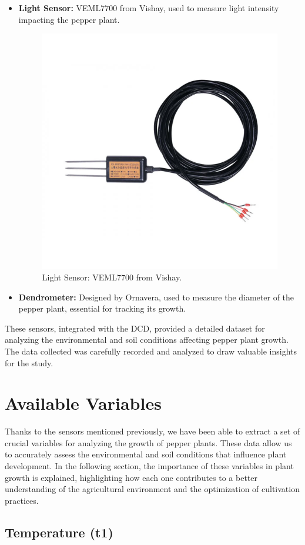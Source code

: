 \begin{itemize}
    \item \textbf{Light Sensor:} VEML7700 from Vishay, used to measure light intensity impacting the pepper plant.
    \begin{figure}[htbp]
        \centering
        \includegraphics[width=6 cm]{4_ChapterMaterials/figuras/MEC10.png}
        \caption{Light Sensor: VEML7700 from Vishay.\cite{ornavera2020dcd}}
        \end{figure}

    \item \textbf{Dendrometer:} Designed by Ornavera, used to measure the diameter of the pepper plant, essential for tracking its growth.
\end{itemize}


These sensors, integrated with the DCD, provided a detailed dataset for analyzing the environmental and soil conditions affecting pepper plant growth. The data collected was carefully recorded and analyzed to draw valuable insights for the study.


\section{Available Variables}

Thanks to the sensors mentioned previously, we have been able to extract a set of crucial variables for analyzing the growth of pepper plants. These data allow us to accurately assess the environmental and soil conditions that influence plant development. In the following section, the importance of these variables in plant growth is explained, highlighting how each one contributes to a better understanding of the agricultural environment and the optimization of cultivation practices.

\subsection{Temperature (t1)}


